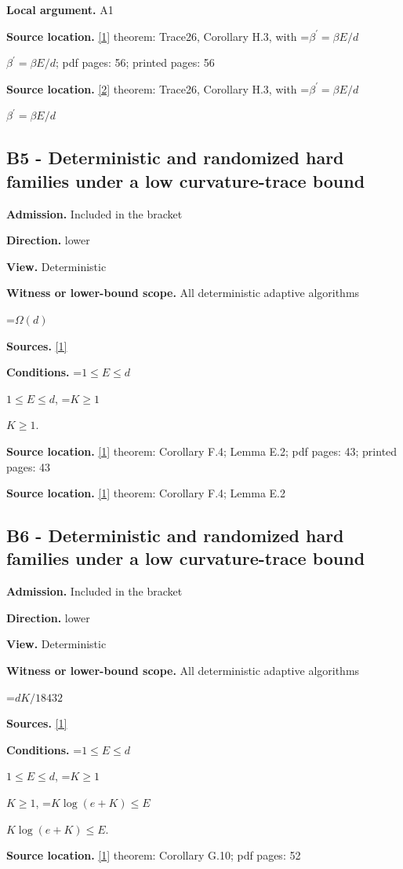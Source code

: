 \documentclass[10pt,a4paper]{article}
\newcommand{\AtlasMath}[1]{\par\begingroup\centering\setbox0=\hbox{$\displaystyle #1$}\ifdim\wd0>1.4\linewidth\typeout{ATLAS WIDE FORMULA: \the\wd0}\fi\ifdim\wd0>\linewidth\resizebox{\linewidth}{!}{\box0}\else\box0\fi\par\endgroup}
\newcommand{\AtlasInlineMath}[1]{\begingroup\setbox0=\hbox{$#1$}\ifdim\wd0>.4\linewidth\endgroup\AtlasMath{#1}\else\endgroup$#1$\fi}
\begin{document}
\textbf{Local argument.} A1

\textbf{Source location.} \href{https://arxiv.org/pdf/2610.27550v2}{[1]} theorem: Trace26, Corollary H.3, with \AtlasInlineMath{\beta^\prime=\beta E/d}; pdf pages: 56; printed pages: 56

\textbf{Source location.} \href{https://arxiv.org/html/2610.19652v1}{[2]} theorem: Trace26, Corollary H.3, with \AtlasInlineMath{\beta^\prime=\beta E/d}

\subsection{B5 - Deterministic and randomized hard families under a low curvature-trace bound}
\textbf{Admission.} Included in the bracket

\textbf{Direction.} lower

\textbf{View.} Deterministic

\textbf{Witness or lower-bound scope.} All deterministic adaptive algorithms

\AtlasMath{\Omega(d)}
\textbf{Sources.} \href{https://arxiv.org/pdf/2610.27550v2}{[1]}

\textbf{Conditions.} \AtlasInlineMath{1\le E\le d}, \AtlasInlineMath{K\ge1}.

\textbf{Source location.} \href{https://arxiv.org/pdf/2610.27550v2}{[1]} theorem: Corollary F.4; Lemma E.2; pdf pages: 43; printed pages: 43

\textbf{Source location.} \href{https://arxiv.org/pdf/2610.27550v2}{[1]} theorem: Corollary F.4; Lemma E.2

\subsection{B6 - Deterministic and randomized hard families under a low curvature-trace bound}
\textbf{Admission.} Included in the bracket

\textbf{Direction.} lower

\textbf{View.} Deterministic

\textbf{Witness or lower-bound scope.} All deterministic adaptive algorithms

\AtlasMath{dK/18432}
\textbf{Sources.} \href{https://arxiv.org/pdf/2610.27550v2}{[1]}

\textbf{Conditions.} \AtlasInlineMath{1\le E\le d}, \AtlasInlineMath{K\ge1}, \AtlasInlineMath{K\log(e+K)\le E}.

\textbf{Source location.} \href{https://arxiv.org/pdf/2610.27550v2}{[1]} theorem: Corollary G.10; pdf pages: 52
\end{document}
